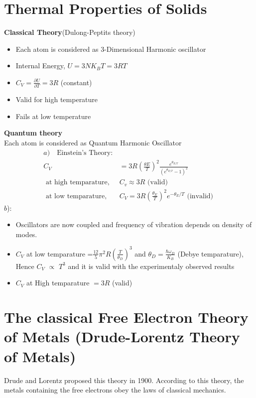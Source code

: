 \section{Thermal Properties of Solids}
\textbf{Classical Theory}(Dulong-Peptits theory)
\begin{itemize}
	\item Each atom is considered as 3-Dimensional Harmonic oscillator
	\item Internal Energy, $U=3NK_BT=3RT$
	\item $C_{V}=\frac{\partial U}{\partial T}=3 R$ (constant)
	\item  Valid for high temperature 
	\item  Fails at low temperature 
\end{itemize}
\textbf{Quantum theory}\\
Each atom is considered as Quantum Harmonic Oscillator
\begin{align*}
a)\quad \text{Einstein's Theory}:\\
C_V&=3R\left(\frac{\theta E}{T} \right) ^2 \frac{e^{\theta_{E/T}}}{(e^{\theta_{E/T}}-1)^2}\\
\text { at high temparature, } &C_{v} \approx 3 R \text { (valid) }\\
\text { at low temparature, }& C_{V}=3 R\left(\frac{\theta_{E}}{T}\right)^{2} e^{-\theta_{E} / T}\text { (invalid) }
\end{align*}
$b$)\quad {}:
\begin{itemize}
	\item Oscillators are now coupled and frequency of vibration depends on density of modes.
	\item $C_{V}$   at low temparature
	=$\frac{12}{5} \pi^{2} R\left(\frac{T}{\theta_{D}}\right)^{3}$ and
	$\theta_{D}=\frac{\hbar \omega_{D}}{K_{B}}$ (Debye temparature), Hence $C_{V}$ $\propto$ $T^{3}$ and it is valid with the experimentaly observed results 
	\item $C_{V}$   at High temparature $=3 R$ (valid) 
\end{itemize}
\section{ The classical Free Electron Theory of Metals (Drude-Lorentz Theory of Metals)} 
Drude and Lorentz proposed this theory in 1900. According to this theory, the metals containing the free electrons obey the laws of classical mechanics.
